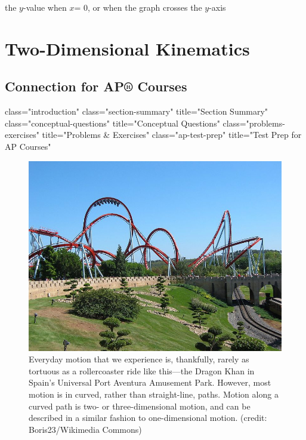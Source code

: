 \documentclass[
]{book}
\providecommand{\tightlist}{%
  \setlength{\itemsep}{0pt}\setlength{\parskip}{0pt}}
\begin{document}
\begin{description}
\tightlist
\item[y-intercept]
the \({y\text{-}}{}\)value when \(x{}\)\emph{}=
0, or when the graph crosses the \(y{}\)-axis
\end{description}

\hypertarget{two-dimensional-kinematics}{%
\chapter{Two-Dimensional Kinematics}\label{two-dimensional-kinematics}}

\hypertarget{connection-for-ap-courses}{%
\section{Connection for AP® Courses}\label{connection-for-ap-courses}}

class="introduction"
class="section-summary"
title="Section Summary"
class="conceptual-questions"
title="Conceptual Questions"
class="problems-exercises"
title="Problems \& Exercises"
class="ap-test-prep" title="Test
Prep for AP Courses"

\begin{figure}
\hypertarget{import-auto-id1165298827978}{%
\centering
\includegraphics{images/Figure_03_00_01a.jpg}
\caption{Everyday motion that we experience is, thankfully, rarely as tortuous
as a rollercoaster ride like this---the Dragon Khan in Spain's
Universal Port Aventura Amusement Park. However, most motion is in
curved, rather than straight-line, paths. Motion along a curved path is
two- or three-dimensional motion, and can be described in a similar
fashion to one-dimensional motion. (credit: Boris23/Wikimedia
Commons)}\label{import-auto-id1165298827978}
}
\end{figure}
\end{document}

